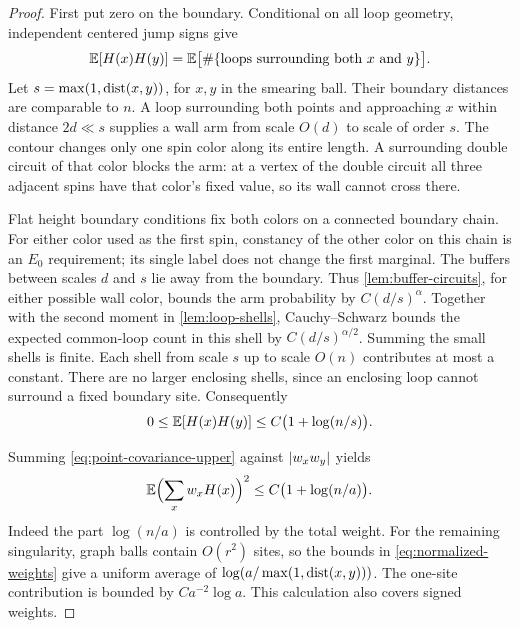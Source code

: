 \begin{proof}
First put zero on the boundary.  Conditional on all loop geometry,
independent centered jump signs give
\begin{equation}\label{eq:common-loop-covariance}
 \mathbb E[H(x)H(y)]
 =\mathbb E\bigl[\#\{\hbox{loops surrounding both }x\hbox{ and }y\}\bigr].
\end{equation}
Let $s=\max(1,\operatorname{dist}(x,y))$, for $x,y$ in the smearing ball.  Their boundary
distances are comparable to $n$.  A loop surrounding both points and
approaching $x$ within distance $2d\ll s$ supplies a wall arm from scale
$O(d)$ to scale of order $s$.  The contour changes only one spin color
along its entire length.  A surrounding double circuit of that color
blocks the arm: at a vertex of the double circuit all three adjacent
spins have that color's fixed value, so its wall cannot cross there.

Flat height boundary conditions fix both colors on a connected boundary
chain.  For either color used as the first spin, constancy of the other
color on this chain is an $E_0$ requirement; its single label does not
change the first marginal.  The buffers between scales $d$ and $s$ lie
away from the boundary.  Thus \cref{lem:buffer-circuits}, for either
possible wall color, bounds the arm probability by $C(d/s)^\alpha$.
Together with the second moment in \cref{lem:loop-shells}, Cauchy--Schwarz
bounds the expected common-loop count in this shell by
$C(d/s)^{\alpha/2}$.  Summing the small shells is finite.  Each shell from
scale $s$ up to scale $O(n)$ contributes at most a constant.  There are no
larger enclosing shells, since an enclosing loop cannot surround a fixed
boundary site.  Consequently
\begin{equation}\label{eq:point-covariance-upper}
 0\leq\mathbb E[H(x)H(y)]\leq C\bigl(1+\log(n/s)\bigr).
\end{equation}

Summing \eqref{eq:point-covariance-upper} against $\lvert w_xw_y\rvert$ yields
\begin{equation}\label{eq:smearing-variance}
 \mathbb E\Bigl(\sum_xw_xH(x)\Bigr)^2
 \leq C\bigl(1+\log(n/a)\bigr).
\end{equation}
Indeed the part $\log(n/a)$ is controlled by the total weight.  For the
remaining singularity, graph balls contain $O(r^2)$ sites, so the bounds
in \eqref{eq:normalized-weights} give a uniform average of
$\log(a/\max(1,\operatorname{dist}(x,y)))$.  The one-site contribution is bounded by
$Ca^{-2}\log a$.  This calculation also covers signed weights.


\end{proof}

